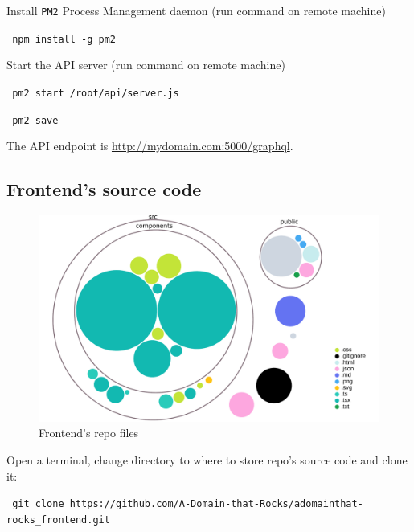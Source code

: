 \medskip

\noindent Install \texttt{PM2} Process Management daemon (run command on remote machine)

\noindent\colorbox{lightestgray}{
	\parbox{1\linewidth-9pt}{%
		\texttt{\tiny\faHashtag\large\ npm install -g pm2}
	}%
}%

\medskip

\noindent Start the \acrshort{API} server (run command on remote machine)

\noindent\colorbox{lightestgray}{
	\parbox{1\linewidth-9pt}{%
		\texttt{\tiny\faHashtag\large\ pm2 start /root/api/server.js}
	}%
}%

\noindent\colorbox{lightestgray}{
	\parbox{1\linewidth-9pt}{%
		\texttt{\tiny\faHashtag\large\ pm2 save}
	}%
}%

\medskip

\noindent The \acrshort{API} endpoint is \url{http://mydomain.com:5000/graphql}.

\subsection{Frontend's source code} \label{subsection:SourceCode/Instructionshowtorunbuildanddeploy/Frontendssourcecode}
\begin{figure}[H]%
	\centering%
	\includegraphics[width=1\textwidth]{images/appendixA/sourcecodefrontendnew.pdf}%
	\caption[Frontend's repo files]{Frontend's repo files}%
	\label{fig:sourcecodefrontendnew}%
\end{figure}%

\noindent Open a terminal, change directory to where to store repo's source code and clone it:

\noindent\colorbox{lightestgray}{
	\parbox{1\linewidth-9pt}{%
		\texttt{\tiny\faDollarSign\large\ git clone https://github.com/A-Domain-that-Rocks/adomainthat-rocks\_frontend.git}
	}%
}%

